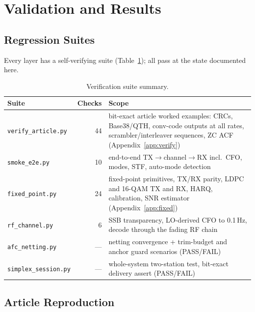 \section{Validation and Results}
\label{sec:results}

\subsection{Regression Suites}

Every layer has a self-verifying suite
(Table~\ref{tab:suites}); all pass at the state documented here.

\begin{table}[H]
    \centering
    \caption{Verification suite summary.}
    \label{tab:suites}
    \small
    \begin{tabular}{@{}lrp{7.6cm}@{}}
    \toprule
    \textbf{Suite} & \textbf{Checks} & \textbf{Scope} \\
    \midrule
    \texttt{verify\_article.py} & 44 & bit-exact article worked examples:
        CRCs, Base38/QTH, conv-code outputs at all rates,
        scrambler/interleaver sequences, ZC ACF
        (Appendix~\ref{app:verify}) \\
    \texttt{smoke\_e2e.py}      & 10 & end-to-end TX$\to$channel$\to$RX
        incl.\ CFO, modes, STF, auto-mode detection \\
    \texttt{fixed\_point.py}    & 24 & fixed-point primitives, TX/RX
        parity, LDPC and 16-QAM TX and RX, HARQ, calibration, SNR
        estimator (Appendix~\ref{app:fixed}) \\
    \texttt{rf\_channel.py}     &  6 & SSB transparency, LO-derived CFO
        to 0.1\,Hz, decode through the fading RF chain \\
    \texttt{afc\_netting.py}    & --- & netting convergence +
        trim-budget and anchor guard scenarios (PASS/FAIL) \\
    \texttt{simplex\_session.py}& --- & whole-system two-station test,
        bit-exact delivery assert (PASS/FAIL) \\
    \bottomrule
    \end{tabular}
\end{table}

\subsection{Article Reproduction}


